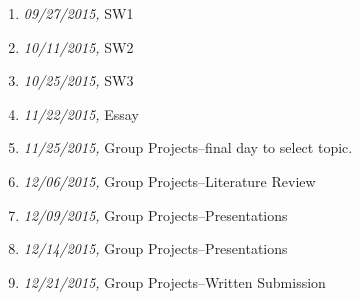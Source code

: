 \documentclass[11pt,article,oneside]{memoir}
\begin{document}
\begin{enumerate}
\item \textit{09/27/2015,} SW1
\item \textit{10/11/2015,} SW2
\item \textit{10/25/2015,} SW3
\item \textit{11/22/2015,} Essay 
\item \textit{11/25/2015,} Group Projects--final day to select topic.
\item \textit{12/06/2015,} Group Projects--Literature Review
\item \textit{12/09/2015,} Group Projects--Presentations
\item \textit{12/14/2015,} Group Projects--Presentations
\item \textit{12/21/2015,} Group Projects--Written Submission
\end{enumerate}




\end{document}
